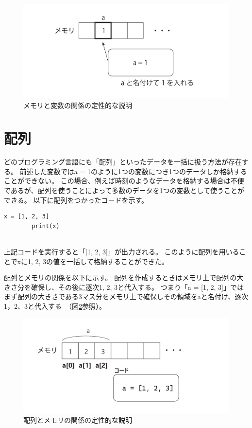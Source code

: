 \documentclass[]{article}
\begin{document}
	\begin{figure}
		\centering
		\includegraphics[width=0.8\linewidth]{figs/memory_explain1.pdf}
		\caption{メモリと変数の関係の定性的な説明}
		\label{fig:memory1}
	\end{figure}

	\section{配列}
	どのプログラミング言語にも「配列」といったデータを一括に扱う方法が存在する。
	前述した変数ではa = 1のように1つの変数につき1つのデータしか格納することができない。
	この場合、例えば時刻のようなデータを格納する場合は不便であるが、配列を使うことによって多数のデータを1つの変数として使うことができる。
	以下に配列をつかったコードを示す。
	\begin{lstlisting}[caption=array.py, label=array]
		x = [1, 2, 3]
		print(x)
	
	\end{lstlisting}
	上記コードを実行すると「[1, 2, 3]」が出力される。
	このように配列を用いることでxに1, 2, 3の値を一括して格納することができた。

	配列とメモリの関係を以下に示す。
	配列を作成するときはメモリ上で配列の大きさ分を確保し、その後に逐次1, 2, 3と代入する。
	つまり「a = [1, 2, 3]」ではまず配列の大きさである3マス分をメモリ上で確保しその領域をaと名付け、逐次1，2、3と代入する~（図\ref{fig:memory2}参照）。
	\begin{figure}
		\centering
		\includegraphics[width=0.8\linewidth]{figs/memory2.pdf}
		\caption{配列とメモリの関係の定性的な説明}
		\label{fig:memory2}
	\end{figure}
\end{document}
